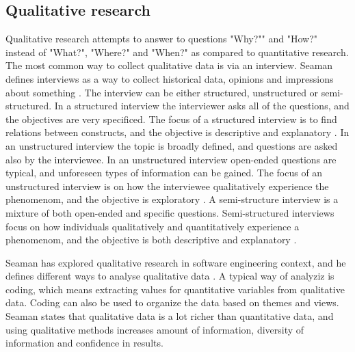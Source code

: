 \documentclass[english]{tktltiki2}
\theoremstyle{definition}
\theoremstyle{remark}
\begin{document}
\subsection{Qualitative research}
Qualitative research attempts to answer to questions "Why?"" and "How?" instead of "What?", "Where?" and "When?" as compared to quantitative research. The most common way to collect qualitative data is via an interview. Seaman defines interviews as a way to collect historical data, opinions and impressions about something \cite{seaman1999qualitative}. The interview can be either structured, unstructured or semi-structured. In a structured interview the interviewer asks all of the questions, and the objectives are very specificed. The focus of a structured interview is to find relations between constructs, and the objective is descriptive and explanatory \cite{runeson2009guidelines}. In an unstructured interview the topic is broadly defined, and questions are asked also by the interviewee. In an unstructured interview open-ended questions are typical, and unforeseen types of information can be gained. The focus of an unstructured interview is on how the interviewee qualitatively experience the phenomenom, and the objective is exploratory \cite{runeson2009guidelines}. A semi-structure interview is a mixture of both open-ended and specific questions. Semi-structured interviews focus on how individuals qualitatively and quantitatively experience a phenomenom, and the objective is both descriptive and explanatory \cite{runeson2009guidelines}.

Seaman has explored qualitative research in software engineering context, and he defines different ways to analyse qualitative data \cite{seaman1999qualitative}. A typical way of analyziz is coding, which means extracting values for quantitative variables from qualitative data. Coding can also be used to organize the data based on themes and views. Seaman states that qualitative data is a lot richer than quantitative data, and using qualitative methods increases amount of information, diversity of information and confidence in results. 
\end{document}

